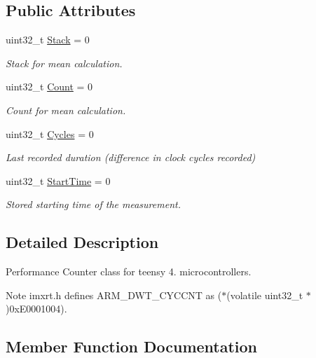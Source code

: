 \subsection*{Public Attributes}
\begin{DoxyCompactItemize}
\item 
uint32\+\_\+t \hyperlink{classPerfCounter_ad440629d44a2bfd9b4d8de185ff66d27}{Stack} = 0
\begin{DoxyCompactList}\small\item\em Stack for mean calculation. \end{DoxyCompactList}\item 
uint32\+\_\+t \hyperlink{classPerfCounter_a8f86300240da2178dea60346ea72651c}{Count} = 0
\begin{DoxyCompactList}\small\item\em Count for mean calculation. \end{DoxyCompactList}\item 
uint32\+\_\+t \hyperlink{classPerfCounter_a60984f26cf145882c0355d28d8233e0a}{Cycles} = 0
\begin{DoxyCompactList}\small\item\em Last recorded duration (difference in clock cycles recorded) \end{DoxyCompactList}\item 
uint32\+\_\+t \hyperlink{classPerfCounter_adefe85b05d9c8920877053f6a8ed743c}{Start\+Time} = 0
\begin{DoxyCompactList}\small\item\em Stored starting time of the measurement. \end{DoxyCompactList}\end{DoxyCompactItemize}


\subsection{Detailed Description}
Performance Counter class for teensy 4. microcontrollers. 

\begin{DoxyNote}{Note}
{\ttfamily imxrt.\+h} defines {\ttfamily A\+R\+M\+\_\+\+D\+W\+T\+\_\+\+C\+Y\+C\+C\+NT} as {\ttfamily ($\ast$(volatile uint32\+\_\+t $\ast$)0x\+E0001004)}. 
\end{DoxyNote}


\subsection{Member Function Documentation}
\mbox{\label{classPerfCounter_ab5d9f05bb15139451eaa857989ed8bd8}} 
